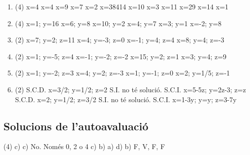 \begin{enumerate}
 	\begin{tasks}(4)
 	 \task x= 2/3,  -1/2 \task x=2, 1/7 \task x=2, -3/5     \task $(1\pm \sqrt{41} )/4$ 
 	 \end{tasks}
  
 	\item[\clauref{t2-r15}]
 	\begin{tasks}(4)
 	 \task x=4    \task x=4    \task x=9   \task x=7   \task x=2    \task x=38414   \task x=10    \task x=3    \task x=11        \task x=29  \task x=14  \task  x=1
 	 \end{tasks}
  
 	\item[\clauref{t2-r16}]
 	\begin{tasks}(4)
 	 \task x=1; y=16     \task x=6; y=8     \task x=10; y=2     \task x=4; y=7    \task x=3; y=1   \task  x=-2; y=8
 	 \end{tasks}
  
 	\item[\clauref{t2-key36}]
 	\begin{tasks}(2)
 	 \task x=7; y=2; z=11 
 	 \task x=4; y=-3; z=0 
 	 \task x=-1; y=4; z=4 
 	 \task x=8; y=4; z=-3 
 	 \end{tasks}

 	 \item[\clauref{t2-key37}]
 	\begin{tasks}(2)
 	 \task x=1; y=-5; z=4 
 	 \task x=-1; y=-2; z=-2 
 	 \task x=15; y=2; z=1 
 	 \task x=3; y=4; z=9 
 	 \end{tasks}

 	 \item[\clauref{t2-key38}]
 	 \begin{tasks}(2)
 	 \task x=1; y=-2; z=3 
 	 \task x=4; y=2; z=-3 
 	 \task x=1; y=-1; z=0 
 	 \task x=2; y=1/5; z=-1 
 	 \end{tasks}

 	 \item[\clauref{t2-key43}]
 	 \begin{tasks}(2)
 	 \task S.C.D. x=3/2; y=1/2; z=2 
 	 \task S.I. no té solució. 
 	 \task S.C.I. x=5-5z; y=2z-3; z=z 
 	 \task S.C.D. x=2; y=1/2; z=3/2
 	 \task S.I. no té solució.
 	 \task S.C.I. x=1-3y; y=y; z=3-7y
 	 \end{tasks}
\end{enumerate}

\subsection*{Solucions de l'autoavaluació}
\begin{tasks}[style=enumerate,label-width=4ex](4)
	\task c)
	\task c)
	\task No. Només 0, 2 o 4
	\task c)
	\task b)
	\task a)
	\task d)
	\task b)
	\task F, V, F, F
\end{tasks}
 


